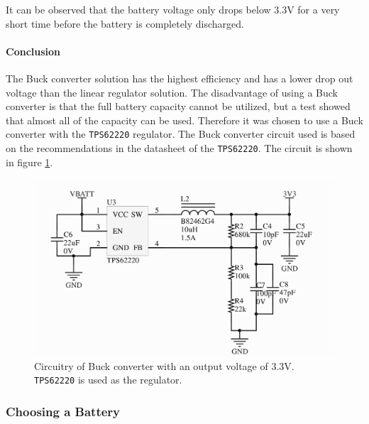 It can be observed that the battery voltage only drops below 3.3V for a very short time before the battery is completely discharged.

\paragraph{Conclusion}
The Buck converter solution has the highest efficiency and has a lower drop out voltage than the linear regulator solution.
The disadvantage of using a Buck converter is that the full battery capacity cannot be utilized, but a test showed that almost all of the capacity can be used.
Therefore it was chosen to use a Buck converter with the \texttt{TPS62220} regulator. 
The Buck converter circuit used is based on the recommendations in the datasheet of the \texttt{TPS62220}.
The circuit is shown in figure \ref{fig:tps62220_circuit}.

\begin{figure}[h]
	\centering
    \includegraphics[width=.8\linewidth]{graphics/tps6220_circuit}
	\caption[3.3 V buck converter circuitry.]{Circuitry of Buck converter with an output voltage of 3.3V. \texttt{TPS62220} is used as the regulator.}
	\label{fig:tps62220_circuit}
\end{figure}

\subsubsection{Choosing a Battery} %
\label{ssub:choosing_a_battery}
